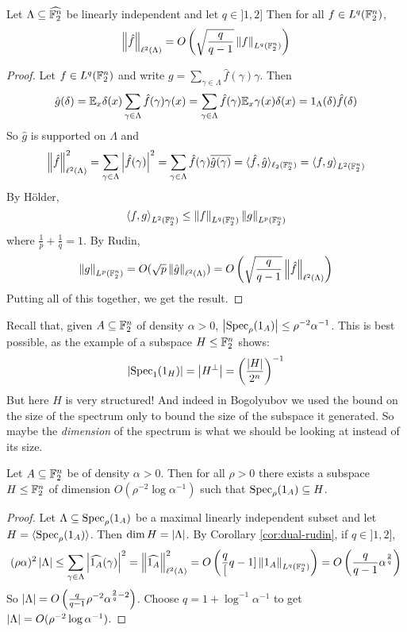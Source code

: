 \documentclass{article}
\begin{document}
\begin{ncor}\label{cor:dual-rudin}
  Let $\Lambda \subseteq \widehat{\mathbb F_2^n}$ be linearly independent and let $q \in ]1, 2]$ Then for all $f \in L^q(\mathbb F_2^n)$,
  $$\left\lVert \hat f\right\rVert_{\ell^2(\Lambda)} = O\left(\sqrt{\frac q{q - 1}} \left\lVert f\right\rVert_{L^q(\mathbb F_2^n)}\right)$$
\end{ncor}
\begin{proof}
  Let $f \in L^q(\mathbb F_2^n)$ and write $g = \sum_{\gamma \in \Lambda} \hat f(\gamma)\gamma$. Then
  $$\hat g(\delta) = \mathbb E_x \delta(x) \sum_{\gamma \in \Lambda} \hat f(\gamma) \gamma(x) = \sum_{\gamma \in \Lambda} \hat f(\gamma) \mathbb E_x \gamma(x)\delta(x) = 1_\Lambda(\delta) \hat f(\delta)$$
  So $\hat g$ is supported on $\Lambda$ and
  $$\left\lVert \hat f\right\rVert_{\ell^2(\Lambda)}^2 = \sum_{\gamma \in \Lambda} \left\lvert \hat f(\gamma)\right\rvert^2 = \sum_{\gamma \in \Lambda} \hat f(\gamma)\overline{\hat g(\gamma)} = \langle\hat f, \hat g\rangle_{\ell_2(\mathbb F_2^n)} = \left\langle f, g\right\rangle_{L^2(\mathbb F_2^n)}$$
  By Hölder,
  $$\left\langle f, g\right\rangle_{L^2(\mathbb F_2^n)} \le \left\lVert f\right\rVert_{L^q(\mathbb F_2^n)}\left\lVert g\right\rVert_{L^p(\mathbb F_2^n)}$$
  where $\frac 1p + \frac 1q = 1$. By Rudin,
  $$\left\lVert g\right\rVert_{L^p(\mathbb F_2^n)} = O(\sqrt p \left\lVert \hat g\right\rVert_{\ell^2(\Lambda)}) = O\left(\sqrt{\frac q{q - 1}} \left\lVert \hat f\right\rVert_{\ell^2(\Lambda)}\right)$$
  Putting all of this together, we get the result.
\end{proof}

Recall that, given $A \subseteq \mathbb F_2^n$ of density $\alpha > 0$, $\left\lvert \operatorname{Spec}_\rho(1_A)\right\rvert \le \rho^{-2}\alpha^{-1}$. This is best possible, as the example of a subspace $H \le \mathbb F_2^n$ shows:
$$\left\lvert \operatorname{Spec}_1(1_H)\right\rvert = \left\lvert H^\perp\right\rvert = \left(\frac{\left\lvert H\right\rvert}{2^n}\right)^{-1}$$
But here $H$ is very structured! And indeed in Bogolyubov we used the bound on the size of the spectrum only to bound the size of the subspace it generated. So maybe the {\it dimension} of the spectrum is what we should be looking at instead of its size.

\begin{nthm}
  Let $A \subseteq \mathbb F_2^n$ be of density $\alpha > 0$. Then for all $\rho > 0$ there exists a subspace $H \le \mathbb F_2^n$ of dimension $O(\rho^{-2}\log\alpha^{-1})$ such that $\operatorname{Spec}_\rho(1_A) \subseteq H$.
\end{nthm}
\begin{proof}
  Let $\Lambda \subseteq \operatorname{Spec}_\rho(1_A)$ be a maximal linearly independent subset and let $H = \langle\operatorname{Spec}_\rho(1_A)\rangle$. Then $\dim H = \left\lvert \Lambda\right\rvert$. By Corollary \ref{cor:dual-rudin}, if $q \in ]1, 2]$,
  $$(\rho\alpha)^2\left\lvert \Lambda\right\rvert \le \sum_{\gamma \in \Lambda} \left\lvert \widehat{1_A}(\gamma)\right\rvert^2 = \left\lVert \widehat{1_A}\right\rVert_{\ell^2(\Lambda)}^2 = O\left(\frac q[q - 1]\left\lVert 1_A\right\rVert_{L^q(\mathbb F_2^n)}\right) = O\left(\frac q{q - 1} \alpha^{\frac 2q}\right)$$
  So $\left\lvert \Lambda\right\rvert = O\left(\frac q{q - 1}\rho^{-2}\alpha^{\frac 2q - 2}\right)$. Choose $q = 1 + \log^{-1} \alpha^{-1}$ to get $\left\lvert \Lambda\right\rvert = O(\rho^{-2}\log\alpha^{-1})$.
\end{proof}
\end{document}
